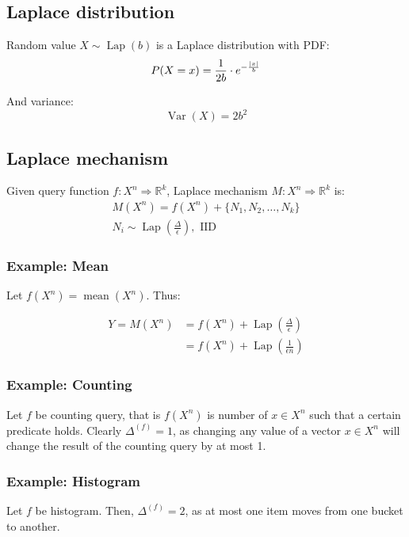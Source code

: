 \documentclass[a4paper]{scrreprt}
\DeclarePairedDelimiter\abs{\lvert}{\rvert}
\begin{document}
\subsection{Laplace distribution}

Random value $X \sim \operatorname{Lap}(b)$ is a Laplace distribution with PDF:
\[
		P(X = x) = \frac{1}{2b} \cdot e^{-\frac{\abs{x}}{b}}
\]

And variance:
\[
		\operatorname{Var}(X) = 2b^2
\]

\subsection{Laplace mechanism}

Given query function $f : X^n \Rightarrow \mathbb{R}^k$, Laplace mechanism $M :
X^n \Rightarrow \mathbb{R}^k$ is:
\begin{align*}
		M(X^n) = f(X^n) + \{N_1, N_2, \ldots, N_k\} \\
		N_i \sim \operatorname{Lap}(\frac{\Delta}{\epsilon}), \text{ IID}
\end{align*}

\subsubsection{Example: Mean}

Let $f(X^n) = \operatorname{mean}(X^n)$. Thus:

\begin{align*}
		Y = M(X^n) & = f(X^n) + \operatorname{Lap}(\frac{\Delta}{\epsilon}) \\
				   & = f(X^n) + \operatorname{Lap}(\frac{1}{\epsilon n})
\end{align*}

\subsubsection{Example: Counting}

Let $f$ be counting query, that is $f(X^n)$ is number of $x \in X^n$ such that
a certain predicate holds. Clearly $\Delta^{(f)} = 1$, as changing any value of
a vector $x \in X^n$ will change the result of the counting query by at most 1.

\subsubsection{Example: Histogram}

Let $f$ be histogram. Then, $\Delta^{(f)} = 2$, as at most one item moves from
one bucket to another.
\end{document}
